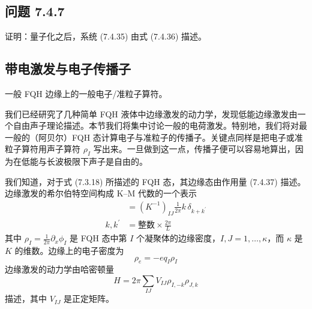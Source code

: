 \subsection*{问题 7.4.7}
证明：量子化之后，系统 (7.4.35) 由式 (7.4.36) 描述。

\subsection{带电激发与电子传播子}

\begin{keypoints}
\item 一般 FQH 边缘上的一般电子/准粒子算符。
\end{keypoints}

我们已经研究了几种简单 FQH 液体中边缘激发的动力学，发现低能边缘激发由一个自由声子理论描述。本节我们将集中讨论一般的电荷激发。特别地，我们将对最一般的（阿贝尔）FQH 态计算电子与准粒子的传播子。关键点同样是把电子或准粒子算符用声子算符 $\rho_{I}$ 写出来。一旦做到这一点，传播子便可以容易地算出，因为在低能与长波极限下声子是自由的。

我们知道，对于式 (7.3.18) 所描述的 FQH 态，其边缘态由作用量 (7.4.37) 描述。边缘激发的希尔伯特空间构成 K--M 代数的一个表示
\begin{align*}
[\rho_{Ik},\rho_{Jk^{\prime}}]&=(K^{-1})_{IJ}\frac{1}{2\pi}k\,\delta_{k+k^{\prime}}\\
k,k^{\prime}&=\text{整数}\times\frac{2\pi}{L} \tag{7.4.38}
\end{align*}
其中 $\rho_{I}=\frac{1}{2\pi}\partial_{x}\phi_{I}$ 是 FQH 态中第 $I$ 个凝聚体的边缘密度，$I,J=1,\ldots,\kappa$，而 $\kappa$ 是 $K$ 的维数。边缘上的电子密度为
\begin{equation*}
\rho_{e}=-eq_{I}\rho_{I}
\end{equation*}
边缘激发的动力学由哈密顿量
\begin{equation*}
H=2\pi\sum_{IJ}V_{IJ}\rho_{I,-k}\rho_{J,k} \tag{7.4.39}
\end{equation*}
描述，其中 $V_{IJ}$ 是正定矩阵。


